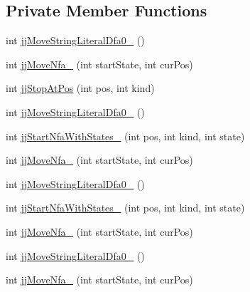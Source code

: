 \subsection*{Private Member Functions}
\begin{DoxyCompactItemize}
\item 
int \hyperlink{classorg_1_1coode_1_1owlapi_1_1obo_1_1parser_1_1_o_b_o_parser_token_manager_a4f976622fa64d95b13608a7776dcf3d2}{jj\-Move\-String\-Literal\-Dfa0\-\_} ()
\item 
int \hyperlink{classorg_1_1coode_1_1owlapi_1_1obo_1_1parser_1_1_o_b_o_parser_token_manager_a49777bf124337ab2017644e32bce826b}{jj\-Move\-Nfa\-\_} (int start\-State, int cur\-Pos)
\item 
int \hyperlink{classorg_1_1coode_1_1owlapi_1_1obo_1_1parser_1_1_o_b_o_parser_token_manager_a7d37380aaecab27de46c801be83cfa74}{jj\-Stop\-At\-Pos} (int pos, int kind)
\item 
int \hyperlink{classorg_1_1coode_1_1owlapi_1_1obo_1_1parser_1_1_o_b_o_parser_token_manager_ac20001aefaab9dabe8a0d1fca9a0e7de}{jj\-Move\-String\-Literal\-Dfa0\-\_} ()
\item 
int \hyperlink{classorg_1_1coode_1_1owlapi_1_1obo_1_1parser_1_1_o_b_o_parser_token_manager_a7e09a2c8ac20d813647b045b693af9f6}{jj\-Start\-Nfa\-With\-States\-\_} (int pos, int kind, int state)
\item 
int \hyperlink{classorg_1_1coode_1_1owlapi_1_1obo_1_1parser_1_1_o_b_o_parser_token_manager_aa801746fe74683e59869028b3c5f3e59}{jj\-Move\-Nfa\-\_} (int start\-State, int cur\-Pos)
\item 
int \hyperlink{classorg_1_1coode_1_1owlapi_1_1obo_1_1parser_1_1_o_b_o_parser_token_manager_a62f348c86ccc147edeafd858c63f14a2}{jj\-Move\-String\-Literal\-Dfa0\-\_} ()
\item 
int \hyperlink{classorg_1_1coode_1_1owlapi_1_1obo_1_1parser_1_1_o_b_o_parser_token_manager_a561db9a471fc876ec874904815459aa5}{jj\-Start\-Nfa\-With\-States\-\_} (int pos, int kind, int state)
\item 
int \hyperlink{classorg_1_1coode_1_1owlapi_1_1obo_1_1parser_1_1_o_b_o_parser_token_manager_abe4a2ec20863bc36d46128ec539cebd8}{jj\-Move\-Nfa\-\_} (int start\-State, int cur\-Pos)
\item 
int \hyperlink{classorg_1_1coode_1_1owlapi_1_1obo_1_1parser_1_1_o_b_o_parser_token_manager_a3079613394a88da66feb7d44a829914e}{jj\-Move\-String\-Literal\-Dfa0\-\_} ()
\item 
int \hyperlink{classorg_1_1coode_1_1owlapi_1_1obo_1_1parser_1_1_o_b_o_parser_token_manager_ad0933b231a54ffa05c41567248b9225a}{jj\-Move\-Nfa\-\_} (int start\-State, int cur\-Pos)

\end{DoxyCompactItemize}
